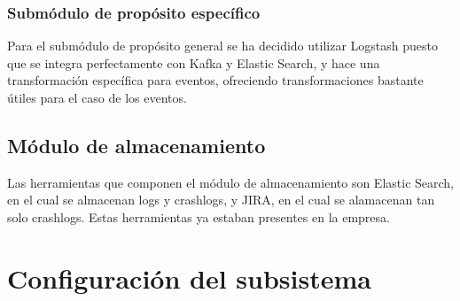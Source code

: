 \subsubsection{Submódulo de propósito específico}
Para el submódulo de propósito general se ha decidido utilizar Logstash puesto que se integra perfectamente con Kafka y Elastic Search, y hace una transformación específica para eventos, ofreciendo transformaciones bastante útiles para el caso de los eventos.

\subsection{Módulo de almacenamiento}
Las herramientas que componen el módulo de almacenamiento son Elastic Search, en el cual se almacenan logs y crashlogs, y JIRA, en el cual se alamacenan tan solo crashlogs. Estas herramientas ya estaban presentes en la empresa.

\section{Configuración del subsistema}


